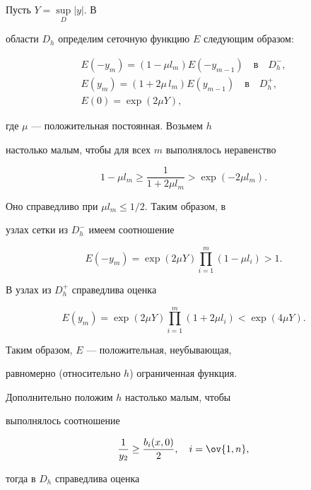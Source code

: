 \begin{pf}


Пусть $Y = \sup \limits_{D} |y|$. В


области $D_h$ определим сеточную функцию $E$ следующим образом:


\begin{gather*}


E(-y_m) = (1-\mu l_m )E(-y_{m-1}) \quad \text{в}


\quad D_h^-,\\


E(y_m) = (1 + 2\mu\,l_m)E(y_{m-1}) \quad \text{в}


\quad D_h^+,\\


E(0) = \exp(2\mu Y),


\end{gather*}


где $\mu$ --- положительная постоянная. Возьмем $h$


настолько малым, чтобы для всех $m$ выполнялось неравенство


$$


1-\mu l_m \geq \frac{1}{1+2\mu l_m} > \exp(-2\mu l_m).


$$


Оно справедливо при $\mu l_m \leq 1/2$. Таким образом, в


узлах сетки из $D_h^-$ имеем соотношение


$$


E(-y_m) = \exp(2\mu Y) \prod_{i=1}^m (1 - \mu l_i) > 1.


$$


В узлах из $D_h^+$ справедлива оценка


$$


E(y_m) = \exp(2\mu Y) \prod_{i=1}^m


(1 + 2\mu l_i) < \exp(4\mu Y).


$$


Таким образом, $E$ --- положительная, неубывающая,


равномерно (относительно $h$) ограниченная функция.


Дополнительно положим $h$ настолько малым, чтобы


выполнялось соотношение


$$


\frac{1}{y_2} \geq \frac{b_i(x,0)}{2}, \quad i=\ov{1,n},


$$


тогда в $D_h$ справедлива оценка


$$



\end{pf}
